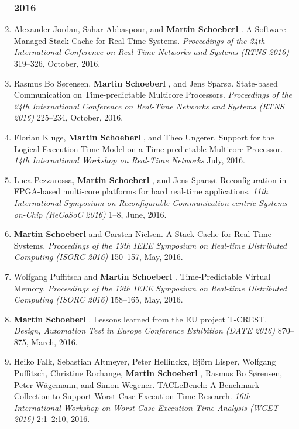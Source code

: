 \begin{enumerate}
\subsubsection*{2016}

\item Alexander Jordan, Sahar Abbaspour, and {\bf Martin Schoeberl }.
 A Software Managed Stack Cache for Real-Time Systems.
 \emph{Proceedings of the 24th International Conference on Real-Time Networks and Systems (RTNS 2016)} 319--326, October, 2016.

\item Rasmus Bo S{\o}rensen, {\bf Martin Schoeberl }, and Jens Spars{\o}.
 State-based Communication on Time-predictable Multicore Processors.
 \emph{Proceedings of the 24th International Conference on Real-Time Networks and Systems (RTNS 2016)} 225--234, October, 2016.

\item Florian Kluge, {\bf Martin Schoeberl }, and Theo Ungerer.
 Support for the Logical Execution Time Model on a Time-predictable Multicore Processor.
 \emph{14th International Workshop on Real-Time Networks} July, 2016.

\item Luca Pezzarossa, {\bf Martin Schoeberl }, and Jens Spars{\o}.
 Reconfiguration in FPGA-based multi-core platforms for hard real-time applications.
 \emph{11th International Symposium on Reconfigurable Communication-centric Systems-on-Chip (ReCoSoC 2016)} 1--8, June, 2016.

\item {\bf Martin Schoeberl } and Carsten Nielsen.
 A Stack Cache for Real-Time Systems.
 \emph{Proceedings of the 19th IEEE Symposium on Real-time Distributed Computing (ISORC 2016)} 150--157, May, 2016.

\item Wolfgang Puffitsch and {\bf Martin Schoeberl }.
 Time-Predictable Virtual Memory.
 \emph{Proceedings of the 19th IEEE Symposium on Real-time Distributed Computing (ISORC 2016)} 158--165, May, 2016.

\item {\bf Martin Schoeberl }.
 Lessons learned from the EU project T-CREST.
 \emph{Design, Automation Test in Europe Conference Exhibition (DATE 2016)} 870--875, March, 2016.

\item Heiko Falk, Sebastian Altmeyer, Peter Hellinckx, Bj{\"o}rn Lisper, Wolfgang Puffitsch, Christine Rochange, {\bf Martin Schoeberl }, Rasmus Bo S{\o}rensen, Peter W{\"a}gemann, and Simon Wegener.
 TACLeBench: A Benchmark Collection to Support Worst-Case Execution Time Research.
 \emph{16th International Workshop on Worst-Case Execution Time Analysis (WCET 2016)} 2:1--2:10, 2016.



\end{enumerate}

